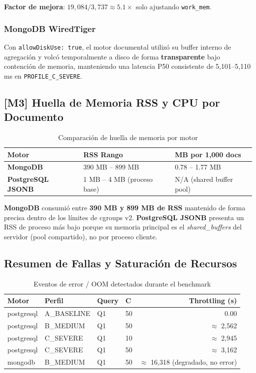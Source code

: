 \documentclass[12pt,a4paper]{article}
\newcommand{\mongo}{\textcolor{mongogreen}{\textbf{MongoDB}}}
\newcommand{\pg}{\textcolor{pgblue}{\textbf{PostgreSQL JSONB}}}
\newcommand{\profileC}{\texttt{PROFILE\_C\_SEVERE}}
\begin{document}
\textbf{Factor de mejora}: $19{,}084 / 3{,}737 \approx \mathbf{5.1\times}$ solo ajustando \texttt{work\_mem}.

\subsubsection{MongoDB WiredTiger}

Con \texttt{allowDiskUse: true}, el motor documental utilizó su buffer interno de agregación y volcó temporalmente a disco de forma \textbf{transparente} bajo contención de memoria, manteniendo una latencia P50 consistente de 5{,}101--5{,}110 ms en \profileC{}.

\subsection{[M3] Huella de Memoria RSS y CPU por Documento}

\begin{table}[H]
\centering
\caption{Comparación de huella de memoria por motor}
\begin{tabular}{lll}
\toprule
\textbf{Motor}      & \textbf{RSS Rango} & \textbf{MB por 1{,}000 docs} \\
\midrule
\mongo{}            & 390 MB -- 899 MB    & 0.78 -- 1.77 MB \\
\pg{}               & 1 MB -- 4 MB (proceso base) & N/A (shared buffer pool) \\
\bottomrule
\end{tabular}
\end{table}

\mongo{} consumió entre \textbf{390 MB y 899 MB de RSS} mantenido de forma precisa dentro de los límites de cgroups v2. \pg{} presenta un RSS de proceso más bajo porque su memoria principal es el \textit{shared\_buffers} del servidor (pool compartido), no por proceso cliente.

\subsection{Resumen de Fallas y Saturación de Recursos}

\begin{table}[H]
\centering
\caption{Eventos de error / OOM detectados durante el benchmark}
\begin{tabular}{llllr}
\toprule
\textbf{Motor} & \textbf{Perfil} & \textbf{Query} & \textbf{C} & \textbf{Throttling (s)} \\
\midrule
\rowcolor{errbg}
postgresql & A\_BASELINE & Q1 & 50  & 0.00 \\
\rowcolor{errbg}
postgresql & B\_MEDIUM   & Q1 & 50  & $\approx$ 2{,}562 \\
\rowcolor{errbg}
postgresql & C\_SEVERE   & Q1 & 10  & $\approx$ 2{,}945 \\
\rowcolor{errbg}
postgresql & C\_SEVERE   & Q1 & 50  & $\approx$ 3{,}162 \\
\rowcolor{warnbg}
mongodb    & B\_MEDIUM   & Q1 & 50  & $\approx$ 16{,}318 (degradado, no error) \\
\bottomrule
\end{tabular}
\end{table}
\end{document}
